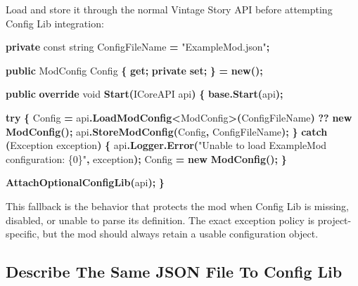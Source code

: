 \documentclass[
  11pt,
  letterpaper,
  titlepage]{article}
\newenvironment{Shaded}{\begin{snugshade}}{\end{snugshade}}
\newcommand{\DataTypeTok}[1]{\textcolor[rgb]{0.13,0.29,0.53}{#1}}
\newcommand{\FunctionTok}[1]{\textcolor[rgb]{0.13,0.29,0.53}{\textbf{#1}}}
\newcommand{\KeywordTok}[1]{\textcolor[rgb]{0.13,0.29,0.53}{\textbf{#1}}}
\newcommand{\NormalTok}[1]{#1}
\newcommand{\OperatorTok}[1]{\textcolor[rgb]{0.81,0.36,0.00}{\textbf{#1}}}
\newcommand{\StringTok}[1]{\textcolor[rgb]{0.31,0.60,0.02}{#1}}
\begin{document}
Load and store it through the normal Vintage Story API before attempting
Config Lib integration:

\begin{Shaded}
\begin{Highlighting}[]
\KeywordTok{private} \DataTypeTok{const} \DataTypeTok{string}\NormalTok{ ConfigFileName }\OperatorTok{=} \StringTok{"ExampleMod.json"}\OperatorTok{;}

\KeywordTok{public}\NormalTok{ ModConfig Config }\OperatorTok{\{} \KeywordTok{get}\OperatorTok{;} \KeywordTok{private} \KeywordTok{set}\OperatorTok{;} \OperatorTok{\}} \OperatorTok{=} \KeywordTok{new}\OperatorTok{();}

\KeywordTok{public} \KeywordTok{override} \DataTypeTok{void} \FunctionTok{Start}\OperatorTok{(}\NormalTok{ICoreAPI api}\OperatorTok{)}
\OperatorTok{\{}
    \KeywordTok{base}\OperatorTok{.}\FunctionTok{Start}\OperatorTok{(}\NormalTok{api}\OperatorTok{);}

    \KeywordTok{try}
    \OperatorTok{\{}
\NormalTok{        Config }\OperatorTok{=}\NormalTok{ api}\OperatorTok{.}\FunctionTok{LoadModConfig}\OperatorTok{\textless{}}\NormalTok{ModConfig}\OperatorTok{\textgreater{}(}\NormalTok{ConfigFileName}\OperatorTok{)} \OperatorTok{??} \KeywordTok{new} \FunctionTok{ModConfig}\OperatorTok{();}
\NormalTok{        api}\OperatorTok{.}\FunctionTok{StoreModConfig}\OperatorTok{(}\NormalTok{Config}\OperatorTok{,}\NormalTok{ ConfigFileName}\OperatorTok{);}
    \OperatorTok{\}}
    \KeywordTok{catch} \OperatorTok{(}\NormalTok{Exception exception}\OperatorTok{)}
    \OperatorTok{\{}
\NormalTok{        api}\OperatorTok{.}\FunctionTok{Logger}\OperatorTok{.}\FunctionTok{Error}\OperatorTok{(}\StringTok{"Unable to load ExampleMod configuration: \{0\}"}\OperatorTok{,}\NormalTok{ exception}\OperatorTok{);}
\NormalTok{        Config }\OperatorTok{=} \KeywordTok{new} \FunctionTok{ModConfig}\OperatorTok{();}
    \OperatorTok{\}}

    \FunctionTok{AttachOptionalConfigLib}\OperatorTok{(}\NormalTok{api}\OperatorTok{);}
\OperatorTok{\}}
\end{Highlighting}
\end{Shaded}

This fallback is the behavior that protects the mod when Config Lib is
missing, disabled, or unable to parse its definition. The exact
exception policy is project-specific, but the mod should always retain a
usable configuration object.

\subsection{Describe The Same JSON File To Config
Lib}\label{describe-the-same-json-file-to-config-lib}
\end{document}
